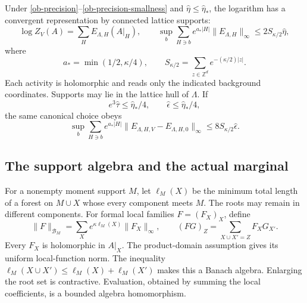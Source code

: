 \begin{theorem}
\label{ob-theorem}
Under \eqref{ob-precision}--\eqref{ob-precision-smallness} and
$\widehat\eta\le\widehat\eta_*$, the logarithm has a convergent
representation by connected lattice supports:
\begin{equation}\label{ob-local-log}
 \log Z_V(A)=\sum_H E_{\Lambda,H}(A|_H),\qquad
 \sup_b\sum_{H\ni b}e^{a_*|H|}
        \|E_{\Lambda,H}\|_\infty
 \le2S_{\kappa/2}\widehat\eta,
\end{equation}
where
\[
 a_*=\min(1/2,\kappa/4),\qquad
 S_{\kappa/2}=\sum_{z\in\mathbb Z^d}e^{-(\kappa/2)|z|}.
\]
Each activity is holomorphic and reads only the indicated
background coordinates. Supports may lie in the lattice hull of
$\Lambda$. If
\begin{equation}\label{ob-quarter}
 e^3\widehat\tau\le\widehat\eta_*/4,\qquad
 \widehat\epsilon\le\widehat\eta_*/4,
\end{equation}
the same canonical choice obeys
\begin{equation}\label{ob-difference}
 \sup_b\sum_{H\ni b}e^{a_*|H|}
  \|E_{\Lambda,H,V}-E_{\Lambda,H,0}\|_\infty
 \le8S_{\kappa/2}\widehat\epsilon.
\end{equation}
\end{theorem}

\subsection{The support algebra and the actual marginal}

For a nonempty moment support $M$, let $\ell_M(X)$ be the
minimum total length of a forest on $M\cup X$ whose every
component meets $M$. The roots may remain in different components.
For formal local families $F=(F_X)_X$, define
\begin{equation}\label{ob-algebra}
 \|F\|_{\mathcal B_M}
   =\sum_Xe^{\kappa\ell_M(X)}\|F_X\|_\infty,\qquad
 (FG)_Z=\sum_{X\cup X'=Z}F_XG_{X'}.
\end{equation}
Every $F_X$ is holomorphic in $A|_X$. The product-domain
assumption gives its uniform local-function norm.
The inequality
$\ell_M(X\cup X')\le\ell_M(X)+\ell_M(X')$
makes this a Banach algebra. Enlarging the root set is
contractive. Evaluation, obtained by summing the local
coefficients, is a bounded algebra homomorphism.

